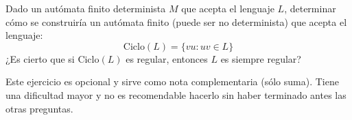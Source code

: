 \documentclass[12pt]{article}
\begin{document}
    \begin{ejercicio}[1 punto]
        Dado un autómata finito determinista $M$ que acepta el lenguaje $L$, determinar cómo se construiría un autómata finito (puede ser no determinista) que acepta el lenguaje:
        \[
            \text{Ciclo}(L) = \{vu : uv \in L\}
        \]
        ¿Es cierto que si $\text{Ciclo}(L)$ es regular, entonces $L$ es siempre regular?
        \begin{observacion}
            Este ejercicio es opcional y sirve como nota complementaria (sólo suma). Tiene una dificultad mayor y no es recomendable
            hacerlo sin haber terminado antes las otras preguntas.
        \end{observacion}
    \end{ejercicio}
\end{document}
